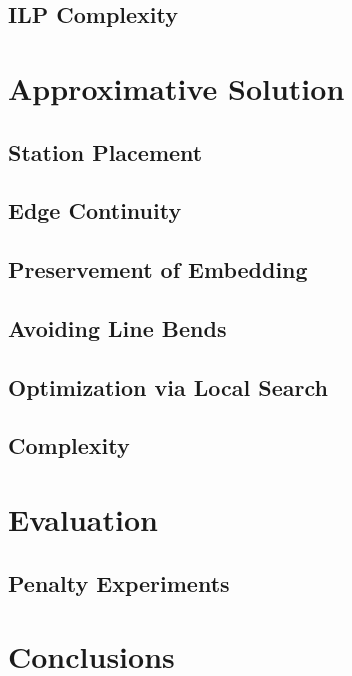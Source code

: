 \documentclass{sig-alternate-sigmod09}
\begin{document}
\subsection{ILP Complexity}



\section{Approximative Solution}

\subsection{Station Placement}

\subsection{Edge Continuity}

\subsection{Preservement of Embedding}

\subsection{Avoiding Line Bends}

\subsection{Optimization via Local Search}

\subsection{Complexity}

\section{Evaluation}

\subsection{Penalty Experiments}

\section{Conclusions}


\balancecolumns
\end{document}
